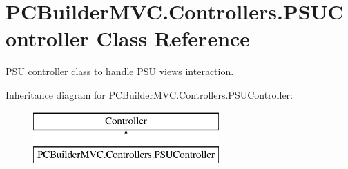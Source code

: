 \hypertarget{class_p_c_builder_m_v_c_1_1_controllers_1_1_p_s_u_controller}{}\section{P\+C\+Builder\+M\+V\+C.\+Controllers.\+P\+S\+U\+Controller Class Reference}
\label{class_p_c_builder_m_v_c_1_1_controllers_1_1_p_s_u_controller}


P\+SU controller class to handle P\+SU views interaction.  


Inheritance diagram for P\+C\+Builder\+M\+V\+C.\+Controllers.\+P\+S\+U\+Controller\+:\begin{figure}[H]
\begin{center}
\leavevmode
\includegraphics[height=2.000000cm]{class_p_c_builder_m_v_c_1_1_controllers_1_1_p_s_u_controller}
\end{center}
\end{figure}
